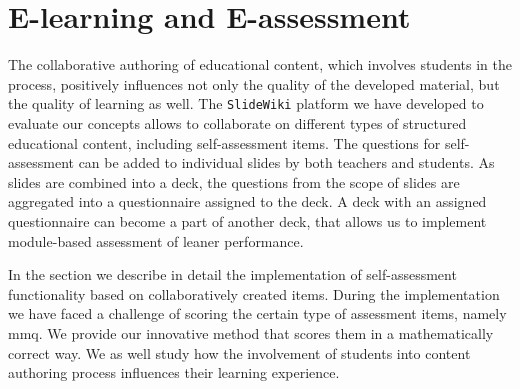 \documentclass[PhD, Submit, ngerman,UKenglish,table]{scrbook}
\begin{document}
%


\chapter{E-learning and E-assessment}
\label{chapter:e-learning}


The collaborative authoring of educational content, which involves students in the process, positively influences not only the quality of the developed material, but the quality of learning as well. 
The \texttt{SlideWiki} platform we have developed to evaluate our concepts allows to collaborate on different types of structured educational content, including self-assessment items.
The questions for self-assessment can be added to individual slides by both teachers and students.
As slides are combined into a deck, the questions from the scope of slides are aggregated into a questionnaire assigned to the deck.
A deck with an assigned questionnaire can become a part of another deck, that allows us to implement module-based assessment of leaner performance.

In the section we describe in detail the implementation of self-assessment functionality based on collaboratively created items.
During the implementation we have faced a challenge of scoring the certain type of assessment items, namely \gls{mmq}.
We provide our innovative method that scores them in a mathematically correct way.
We as well study how the involvement of students into content authoring process influences their learning experience. 
\end{document}

